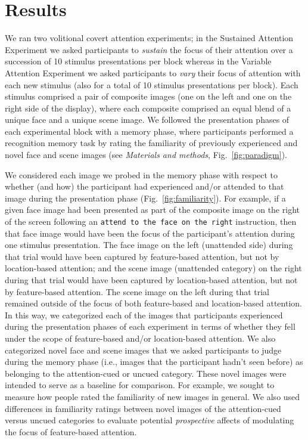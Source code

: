 \documentclass[english]{article}
\begin{document}
\section*{Results}
We ran two volitional covert attention experiments; in the Sustained Attention Experiment we asked participants to \textit{sustain} the focus of their attention over a succession of 10 stimulus presentations per block whereas in the Variable Attention Experiment we asked participants to \textit{vary} their focus of attention with each new stimulus (also for a total of 10 stimulus presentations per block).  Each stimulus comprised a pair of composite images (one on the left and one on the right side of the display), where each composite comprised an equal blend of a unique face and a unique scene image.  We followed the presentation phases of each experimental block with a memory phase, where participants performed a recognition memory task by rating the familiarity of previously experienced and novel face and scene images (see \textit{Materials and methods}, Fig.~\ref{fig:paradigm}).

We considered each image we probed in the memory phase with respect to whether (and how) the participant had experienced and/or attended to that image during the presentation phase (Fig.~\ref{fig:familiarity}).  For example, if a given face image had been presented as part of the composite image on the right of the screen following an \texttt{attend to the face on the right} instruction, then that face image would have been the focus of the participant's attention during one stimulus presentation.  The face image on the left (unattended side) during that trial would have been captured by feature-based attention, but not by location-based attention; and the scene image (unattended category) on the right during that trial would have been captured by location-based attention, but not by feature-based attention.  The scene image on the left during that trial remained outside of the focus of both feature-based and location-based attention.  In this way, we categorized each of the images that participants experienced during the presentation phases of each experiment in terms of whether they fell under the scope of feature-based and/or location-based attention.  We also categorized novel face and scene images that we asked participants to judge during the memory phase (i.e., images that the participant hadn't seen before) as belonging to the attention-cued or uncued category.  These novel images were intended to serve as a baseline for comparison.  For example, we sought to measure how people rated the familiarity of new images in general.  We also used differences in familiarity ratings between novel images of the attention-cued versus uncued categories to evaluate potential \textit{prospective} affects of modulating the focus of feature-based attention.
\end{document}
